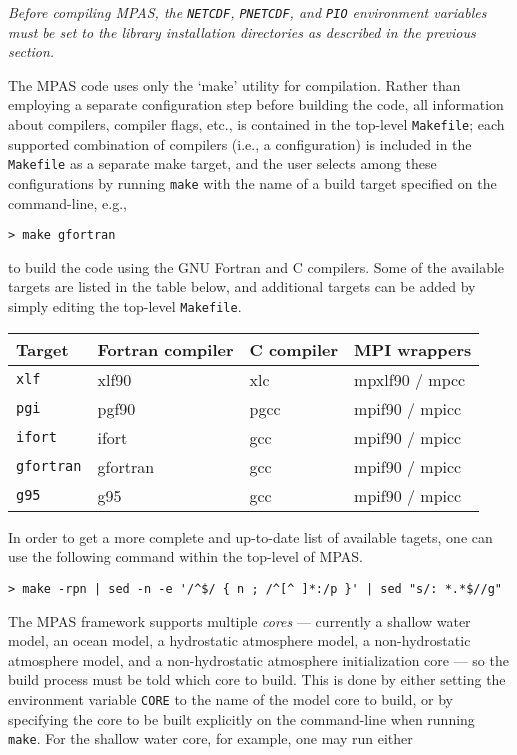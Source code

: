 {\em Before compiling MPAS, the {\tt NETCDF}, {\tt PNETCDF}, and {\tt PIO} environment variables must be set to the library installation directories as
described in the previous section.}

The MPAS code uses only the `make' utility for compilation. Rather than employing a separate configuration step
before building the code, all information about compilers, compiler flags, etc., is contained in the top-level {\tt Makefile}; each
supported combination of compilers (i.e., a configuration) is included in the {\tt Makefile} as a separate make target, and the user selects among
these configurations by running {\tt make} with the name of a build target specified on the command-line, e.g.,

\vspace{12pt}
{\tt > make gfortran}
\vspace{12pt}

\noindent to build the code using the GNU Fortran and C compilers. Some of the available targets are listed in the table below, and additional
targets can be added by simply editing the top-level {\tt Makefile}.

\vspace{12pt}
\begin{longtable}{| l | l | l | l |}
\hline
Target & Fortran compiler & C compiler & MPI wrappers \\ \hline \hline
{\tt xlf} & xlf90 & xlc & mpxlf90 / mpcc \\ \hline
{\tt pgi} & pgf90 & pgcc & mpif90 / mpicc \\ \hline
{\tt ifort} & ifort & gcc & mpif90 / mpicc \\ \hline
{\tt gfortran} & gfortran & gcc & mpif90 / mpicc \\ \hline
{\tt g95} & g95 & gcc & mpif90 / mpicc \\ \hline
\end{longtable}
\vspace{12pt}

In order to get a more complete and up-to-date list of available tagets, one can use the following command within the top-level of MPAS.
{\small
\begin{verbatim}
> make -rpn | sed -n -e '/^$/ { n ; /^[^ ]*:/p }' | sed "s/: *.*$//g"
\end{verbatim}
}

The MPAS framework supports multiple {\em cores} --- currently a shallow water
model, an ocean model, a hydrostatic atmosphere model, a non-hydrostatic atmosphere model, and a non-hydrostatic atmosphere initialization core --- so the build
process must be told which core to build. This is done by either setting the environment variable
{\tt CORE} to the name of the model core to build, or by specifying the core to be built explicitly on the command-line
when running {\tt make}. For the shallow water core, for example, one may run either

